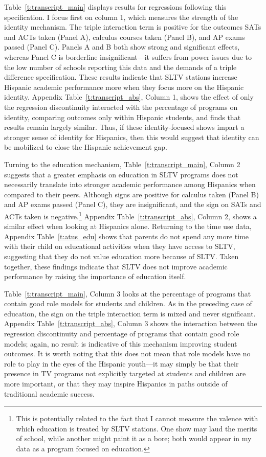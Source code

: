 \documentclass[11pt]{article}
\begin{document}
Table~\ref{t:transcript_main} displays results for regressions following this specification. I focus first on column 1, which measures the strength of the identity mechanism. The triple interaction term is positive for the outcomes SATs and ACTs taken (Panel A), calculus courses taken (Panel B), and AP exams passed (Panel C). Panels A and B both show strong and significant effects, whereas Panel C is borderline insignificant---it suffers from power issues due to the low number of schools reporting this data and the demands of a triple difference specification. These results indicate that SLTV stations increase Hispanic academic performance more when they focus more on the Hispanic identity. Appendix Table~\ref{t:transcript_abs}, Column 1, shows the effect of only the regression discontinuity interacted with the percentage of programs on identity, comparing outcomes only within Hispanic students, and finds that results remain largely similar. Thus, if these identity-focused shows impart a stronger sense of identity for Hispanics, then this would suggest that identity can be mobilized to close the Hispanic achievement gap.

Turning to the education mechanism, Table~\ref{t:transcript_main}, Column 2 suggests that a greater emphasis on education in SLTV programs does not necessarily translate into stronger academic performance among Hispanics when compared to their peers. Although signs are positive for calculus taken (Panel B) and AP exams passed (Panel C), they are insignificant, and the sign on SATs and ACTs taken is negative.\footnote{ This is potentially related to the fact that I cannot measure the valence with which education is treated by SLTV stations. One show may laud the merits of school, while another might paint it as a bore; both would appear in my data as a program focused on education.} Appendix Table~\ref{t:transcript_abs}, Column 2, shows a similar effect when looking at Hispanics alone. Returning to the time use data, Appendix Table~\ref{t:atus_edu} shows that parents do not spend any more time with their child on educational activities when they have access to SLTV, suggesting that they do not value education more because of SLTV. Taken together, these findings indicate that SLTV does not improve academic performance by raising the importance of education itself.

Table~\ref{t:transcript_main}, Column 3 looks at the percentage of programs that contain good role models for students and children. As in the preceding case of education, the sign on the triple interaction term is mixed and never significant. Appendix Table~\ref{t:transcript_abs}, Column 3 shows the interaction between the regression discontinuity and percentage of programs that contain good role models; again, no result is indicative of this mechanism improving student outcomes. It is worth noting that this does not mean that role models have no role to play in the eyes of the Hispanic youth---it may simply be that their presence in TV programs not explicitly targeted at students and children are more important, or that they may inspire Hispanics in paths outside of traditional academic success.
\end{document}
